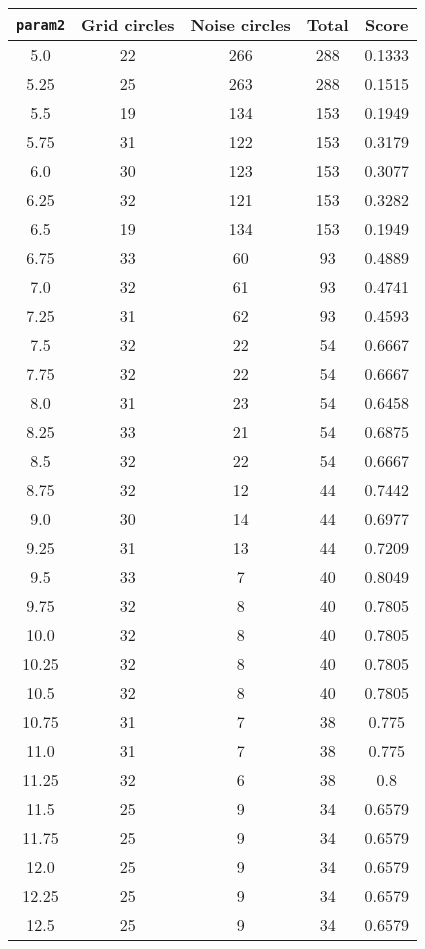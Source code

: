 \documentclass[letterpaper, 12pt]{article}
\begin{document}
\begin{longtable}{|c|c|c|c|c|}
\hline
\textbf{\texttt{param2}} & \textbf{Grid circles} & \textbf{Noise circles} & \textbf{Total} & \textbf{Score} \\
\hline
5.0 & 22 & 266 & 288 & 0.1333 \\
\hline
5.25 & 25 & 263 & 288 & 0.1515 \\
\hline
5.5 & 19 & 134 & 153 & 0.1949 \\
\hline
5.75 & 31 & 122 & 153 & 0.3179 \\
\hline
6.0 & 30 & 123 & 153 & 0.3077 \\
\hline
6.25 & 32 & 121 & 153 & 0.3282 \\
\hline
6.5 & 19 & 134 & 153 & 0.1949 \\
\hline
6.75 & 33 & 60 & 93 & 0.4889 \\
\hline
7.0 & 32 & 61 & 93 & 0.4741 \\
\hline
7.25 & 31 & 62 & 93 & 0.4593 \\
\hline
7.5 & 32 & 22 & 54 & 0.6667 \\
\hline
7.75 & 32 & 22 & 54 & 0.6667 \\
\hline
8.0 & 31 & 23 & 54 & 0.6458 \\
\hline
8.25 & 33 & 21 & 54 & 0.6875 \\
\hline
8.5 & 32 & 22 & 54 & 0.6667 \\
\hline
8.75 & 32 & 12 & 44 & 0.7442 \\
\hline
9.0 & 30 & 14 & 44 & 0.6977 \\
\hline
9.25 & 31 & 13 & 44 & 0.7209 \\
\hline
9.5 & 33 & 7 & 40 & 0.8049 \\
\hline
9.75 & 32 & 8 & 40 & 0.7805 \\
\hline
10.0 & 32 & 8 & 40 & 0.7805 \\
\hline
10.25 & 32 & 8 & 40 & 0.7805 \\
\hline
10.5 & 32 & 8 & 40 & 0.7805 \\
\hline
10.75 & 31 & 7 & 38 & 0.775 \\
\hline
11.0 & 31 & 7 & 38 & 0.775 \\
\hline
11.25 & 32 & 6 & 38 & 0.8 \\
\hline
11.5 & 25 & 9 & 34 & 0.6579 \\
\hline
11.75 & 25 & 9 & 34 & 0.6579 \\
\hline
12.0 & 25 & 9 & 34 & 0.6579 \\
\hline
12.25 & 25 & 9 & 34 & 0.6579 \\
\hline
12.5 & 25 & 9 & 34 & 0.6579 \\

\end{longtable}
\end{document}
